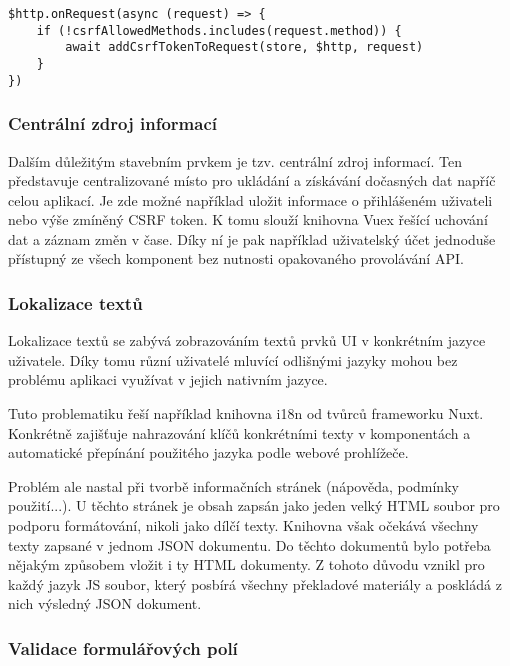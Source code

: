 		\begin{lstlisting}[caption={Vkládání CSRF tokenu do každého požadavku putujícího na API server. Zdroj: [autor]}]
$http.onRequest(async (request) => {
	if (!csrfAllowedMethods.includes(request.method)) {
		await addCsrfTokenToRequest(store, $http, request)
	}
})
		\end{lstlisting}

		\subsubsection{Centrální zdroj informací}

		Dalším důležitým stavebním prvkem je tzv. centrální zdroj informací.
		Ten představuje centralizované místo pro ukládání a získávání dočasných dat napříč celou aplikací.
		Je zde možné například uložit informace o přihlášeném uživateli nebo výše zmíněný \ac{CSRF} token.
		K tomu slouží knihovna Vuex řešící uchování dat a záznam změn v čase.
		Díky ní je pak například uživatelský účet jednoduše přístupný ze všech komponent bez nutnosti opakovaného provolávání
		\ac{API}.

		\subsubsection{Lokalizace textů}

		Lokalizace textů se zabývá zobrazováním textů prvků \ac{UI} v konkrétním jazyce uživatele.
		Díky tomu různí uživatelé mluvící odlišnými jazyky mohou bez problému aplikaci využívat v jejich nativním jazyce.

		Tuto problematiku řeší například knihovna i18n od tvůrců frameworku Nuxt.
		Konkrétně zajišťuje nahrazování klíčů konkrétními texty v komponentách a automatické přepínání použitého jazyka
		podle webové prohlížeče.

		Problém ale nastal při tvorbě informačních stránek (nápověda, podmínky použití...).
		U těchto stránek je obsah zapsán jako jeden velký \ac{HTML} soubor pro podporu formátování, nikoli
		jako dílčí texty.
		Knihovna však očekává všechny texty zapsané v jednom \ac{JSON} dokumentu.
		Do těchto dokumentů bylo potřeba nějakým způsobem vložit i ty \ac{HTML} dokumenty.
		Z tohoto důvodu vznikl pro každý jazyk \ac{JS} soubor, který posbírá všechny překladové materiály a poskládá z nich
		výsledný \ac{JSON} dokument.

		\subsubsection{Validace formulářových polí}

